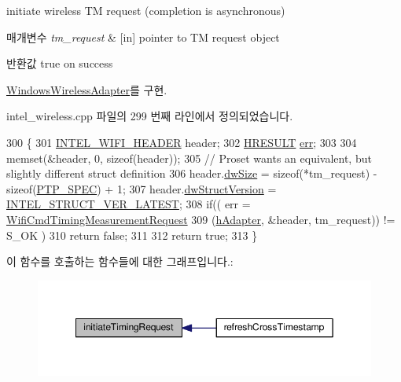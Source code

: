 initiate wireless TM request (completion is asynchronous) 


\begin{DoxyParams}{매개변수}
{\em tm\+\_\+request} & \mbox{[}in\mbox{]} pointer to TM request object \\
\hline
\end{DoxyParams}
\begin{DoxyReturn}{반환값}
true on success 
\end{DoxyReturn}


\hyperlink{class_windows_wireless_adapter_a87c023acaa8f59c76b3487fc10a3242a}{Windows\+Wireless\+Adapter}를 구현.



intel\+\_\+wireless.\+cpp 파일의 299 번째 라인에서 정의되었습니다.


\begin{DoxyCode}
300 \{
301     \hyperlink{struct___i_n_t_e_l___w_i_f_i___h_e_a_d_e_r}{INTEL\_WIFI\_HEADER} header;
302     \hyperlink{intel__wireless_8hpp_af4eacc2ae01b6cc02946c0598187bc50}{HRESULT} \hyperlink{gst__avb__playbin_8c_a6ce68847c12434f60d1b2654a3dc3409}{err};
303 
304     memset(&header, 0, \textcolor{keyword}{sizeof}(header));
305     \textcolor{comment}{// Proset wants an equivalent, but slightly different struct definition}
306     header.\hyperlink{struct___i_n_t_e_l___w_i_f_i___h_e_a_d_e_r_a669c5a85f5a9eb97e64ad880fadaaa2d}{dwSize} = \textcolor{keyword}{sizeof}(*tm\_request) - \textcolor{keyword}{sizeof}(\hyperlink{wireless__tstamper_8hpp_a4f0884fe8f53e92876fa1ea5cc4c72ce}{PTP\_SPEC}) + 1;
307     header.\hyperlink{struct___i_n_t_e_l___w_i_f_i___h_e_a_d_e_r_a1955a5d9a8f0620b32d679505ea5b0ae}{dwStructVersion} = \hyperlink{intel__wireless_8hpp_aeb30ed191fda90ec49ca8f802bb2299d}{INTEL\_STRUCT\_VER\_LATEST};
308     \textcolor{keywordflow}{if}(( err = \hyperlink{intel__wireless_8cpp_a7f6550d1de9728ddf81a84789d74d008}{WifiCmdTimingMeasurementRequest}
309          (\hyperlink{class_intel_wireless_adapter_a691881600d67a63fef617bf58a70736c}{hAdapter}, &header, tm\_request)) != S\_OK )
310         \textcolor{keywordflow}{return} \textcolor{keyword}{false};
311 
312     \textcolor{keywordflow}{return} \textcolor{keyword}{true};
313 \}
\end{DoxyCode}


이 함수를 호출하는 함수들에 대한 그래프입니다.\+:
\nopagebreak
\begin{figure}[H]
\begin{center}
\leavevmode
\includegraphics[width=349pt]{class_intel_wireless_adapter_af37854fbd1bc7c7d9f24939df96ff393_icgraph}
\end{center}
\end{figure}


